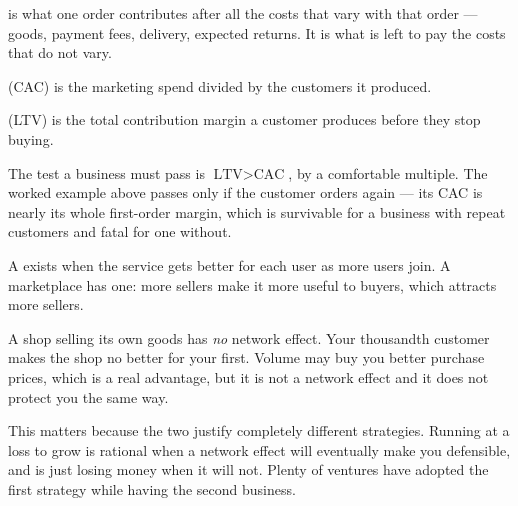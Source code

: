\begin{definitionbox}
 is what one order contributes after all the costs
that vary with that order --- goods, payment fees, delivery, expected returns.
It is what is left to pay the costs that do not vary.

\smallskip
{} (CAC) is the marketing spend divided by the
customers it produced.

\smallskip
{} (LTV) is the total contribution margin a customer
produces before they stop buying.

\smallskip
The test a business must pass is $\text{LTV} > \text{CAC}$, by a comfortable
multiple. The worked example above passes only if the customer orders again ---
its CAC is nearly its whole first-order margin, which is survivable for a
business with repeat customers and fatal for one without.
\end{definitionbox}

\begin{alertbox}
A  exists when the service gets better for each user as
more users join. A marketplace has one: more sellers make it more useful to
buyers, which attracts more sellers.

\smallskip
A shop selling its own goods has \emph{no} network effect. Your thousandth
customer makes the shop no better for your first. Volume may buy you better
purchase prices, which is a real advantage, but it is not a network effect and
it does not protect you the same way.

\smallskip
This matters because the two justify completely different strategies. Running
at a loss to grow is rational when a network effect will eventually make you
defensible, and is just losing money when it will not. Plenty of ventures have
adopted the first strategy while having the second business.
\end{alertbox}

